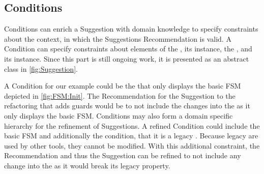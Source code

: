 \subsection{Conditions}
\label{sec:Conditions}

\textsf{Condition}s can enrich a \textsf{Suggestion} with domain knowledge to 
specify constraints about the context, in which the \textsf{Suggestion}s 
\textsf{Recommendation} is valid. A \textsf{Condition} can specify constraints 
about elements of the \metamodel, its instance, the \viewtype \metamodel, and 
its instance. 
Since this part is still ongoing work, it is presented as an abstract class 
in \cref{fig:Suggestion}.

A \textsf{Condition} for our example could be the \viewtype that 
only displays the basic \textsf{FSM} depicted in \cref{fig:FSM:Init}. 
The \textsf{Recommendation} for the \textsf{Suggestion} to the refactoring that 
adds guards would be to not include the \metamodel changes into the \viewtype as
it only displays the basic \textsf{FSM}. \textsf{Conditions} may also form a 
domain specific hierarchy for the refinement of \textsf{Suggestion}s. A refined 
\textsf{Condition} could include the basic \textsf{FSM} \viewtype and additionally
the condition, that it is a legacy \viewtype. Because legacy \viewtypes are used
by other tools, they cannot be modified. With this additional constraint, the 
\textsf{Recommendation} and thus the \textsf{Suggestion} can be refined to not 
include any \metamodel change into the \viewtype as it would break its legacy 
property.